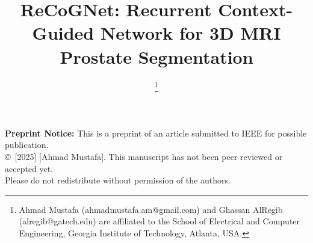 \documentclass[journal]{IEEEtran}
\begin{document}
%

\onecolumn
\noindent
\textbf{Preprint Notice:} This is a preprint of an article submitted to IEEE for possible publication. \\
\copyright~[2025] [Ahmad Mustafa]. This manuscript has not been peer reviewed or accepted yet. \\
Please do not redistribute without permission of the authors.

\vspace{1cm}
\twocolumn

\title{ReCoGNet: Recurrent Context-Guided Network for 3D MRI Prostate Segmentation}
%
%
%


\author{
\thanks{Ahmad Mustafa (ahmadmustafa.am@gmail.com) and Ghassan AlRegib (alregib@gatech.edu) are affiliated to the School of Electrical and Computer Engineering, Georgia Institute of Technology, Atlanta, USA.}
}

% 
%
\end{document}
